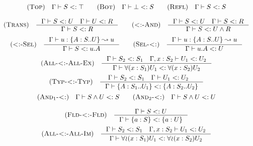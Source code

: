 \[\begin{array}{c}
    \RULE{Top} \quad \SJ{\Gamma}{S}{\top} \qquad

    \RULE{Bot} \quad \SJ{\Gamma}{\bot}{S} \qquad

    \RULE{Refl} \quad \SJ{\Gamma}{S}{S} \\[4mm]

    \RULE{Trans} \quad \inference{
        \SJ{\Gamma}{S}{U} \quad
        \SJ{\Gamma}{U}{R}
    }{
        \SJ{\Gamma}{S}{R}
    } \qquad

    \RULE{<:-And} \quad \inference{
        \SJ{\Gamma}{S}{U} \quad
        \SJ{\Gamma}{S}{R}
    }{
        \SJ{\Gamma}{S}{\AGG{U}{R}}
    } \\[4mm]

    \RULE{<:-Sel} \quad \inference{
        \TJ{\Gamma}{u}{\TDEC{A}{S}{U}}{u}
    }{
        \SJ{\Gamma}{S}{u.A}
    } \qquad

    \RULE{Sel-<:} \quad \inference{
        \TJ{\Gamma}{u}{\TDEC{A}{S}{U}}{u}
    }{
        \SJ{\Gamma}{u.A}{U}
    } \\[4mm]

    \RULE{All-<:-All-Ex} \quad \inference{
        \SJ{\Gamma}{S_2}{S_1} \quad
        \SJ{\Gamma, x: S_2}{U_1}{U_2}
    }{
        \SJ{\Gamma}{\DFUN{x}{S_1}{U_1}}{\DFUN{x}{S_2}{U_2}}
    } \\[4mm]

    \RULE{Typ-<:-Typ} \quad \inference{
        \SJ{\Gamma}{S_2}{S_1} \quad
        \SJ{\Gamma}{U_1}{U_2} \quad
    }{
        \SJ{\Gamma}{\TDEC{A}{S_1}{U_1}}{\TDEC{A}{S_2}{U_2}}
    } \\[4mm]

    \RULE{And$_1$-<:} \quad \SJ{\Gamma}{\AGG{S}{U}}{S} \qquad

    \RULE{And$_2$-<:} \quad \SJ{\Gamma}{\AGG{S}{U}}{U} \\[4mm]

    \RULE{Fld-<:-Fld} \quad \inference{
        \SJ{\Gamma}{S}{U}
    }{
        \SJ{\Gamma}{\FDEC{a}{S}}{\FDEC{a}{U}}
    } \\[4mm]

    \RULE{All-<:-All-Im} \quad \inference{
        \SJ{\Gamma}{S_2}{S_1} \quad
        \SJ{\Gamma, x: S_2}{U_1}{U_2}
    }{
        \SJ{\Gamma}{\IFUN{x}{S_1}{U_1}}{\IFUN{x}{S_2}{U_2}}
    }
\end{array}\]
